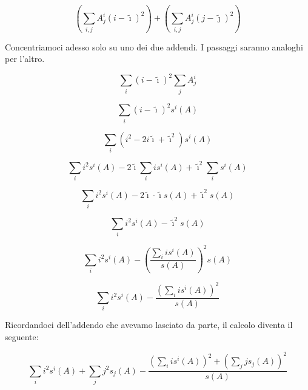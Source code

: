 \begin{equation*}
    \left( \sum_{i,j} A^i_j (i-\tilde{ \imath })^2 \right)
    +
    \left( \sum_{i,j} A^i_j (j-\tilde{ \jmath })^2 \right)
\end{equation*}

Concentriamoci adesso solo su uno dei due addendi. I passaggi saranno analoghi per l'altro.

\begin{equation*}
    \sum_i (i-\tilde{ \imath })^2 \sum_j A^i_j
\end{equation*}

\begin{equation*}
    \sum_i (i-\tilde{ \imath })^2 s^i(A)
\end{equation*}

\begin{equation*}
    \sum_i (i^2 - 2i\tilde{\imath} + \tilde{\imath}^2) s^i(A)
\end{equation*}

\begin{equation*}
    \sum_i i^2 s^i(A) - 2 \tilde{\imath} \sum_i i s^i(A) + \tilde{\imath}^2 \sum_i s^i(A)
\end{equation*}

\begin{equation*}
    \sum_i i^2 s^i(A) - 2 \tilde{\imath} \cdot \tilde{\imath} s(A) + \tilde{\imath}^2 s(A)
\end{equation*}

\begin{equation*}
    \sum_i i^2 s^i(A) - \tilde{\imath}^2 s(A)
\end{equation*}

\begin{equation*}
    \sum_i i^2 s^i(A) - \left( \frac{\displaystyle{\sum_i i s^i(A)}}{s(A)} \right)^2 s(A)
\end{equation*}

\begin{equation*}
    \sum_i i^2 s^i(A) - \frac{\displaystyle{\left(\sum_i i s^i(A)\right)}^2}{s(A)}
\end{equation*}

Ricordandoci dell'addendo che avevamo lasciato da parte, il calcolo diventa il seguente:

\begin{equation*}
    \sum_i i^2 s^i(A) + \sum_j j^2 s_j(A)
    - \frac
        {\displaystyle{
            \left(
                \sum_i i s^i(A)
            \right) ^2
            +
            \left(
                \sum_j j s_j(A)
            \right) ^2
        }}
        {s(A)}
\end{equation*}

